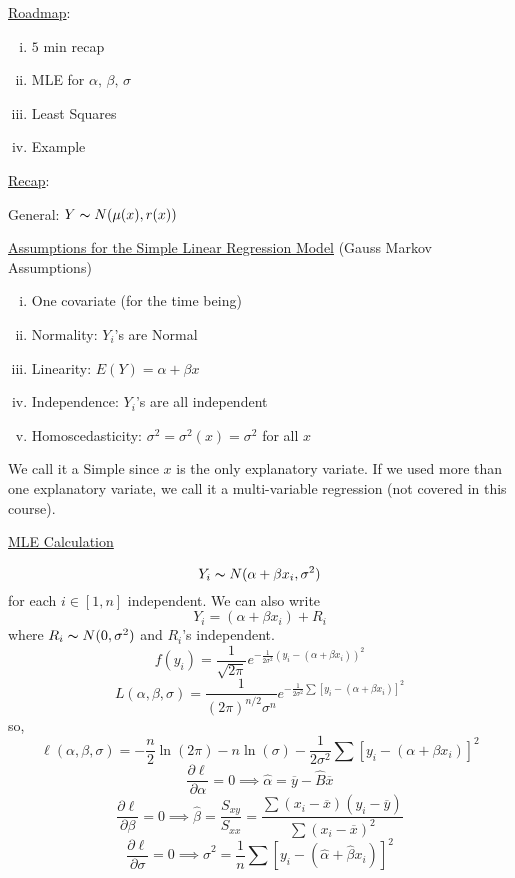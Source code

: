 \underline{Roadmap}:
\begin{enumerate}[(i)]
    \item $ 5 $ min recap
    \item MLE for $ \alpha,\,\beta,\,\sigma $
    \item Least Squares
    \item Example
\end{enumerate}

\underline{Recap}:

General: $ Y \thicksim N(\mu(x),r(x)) $

\underline{Assumptions for the Simple Linear Regression Model}
(Gauss Markov Assumptions)
\begin{enumerate}[(i)]
    \item One covariate (for the time being)
    \item Normality: $ Y_i $'s are Normal
    \item Linearity: $ E(Y)=\alpha+\beta x $
    \item Independence: $ Y_i $'s are all independent
    \item Homoscedasticity: $ \sigma^2=\sigma^2(x)=\sigma^2 $ for all $ x $
\end{enumerate}
We call it a Simple since $ x $ is the only
explanatory variate. If we used more than one explanatory variate,
we call it a multi-variable regression (not covered in this course).

\underline{MLE Calculation}

\[ Y_i \thicksim N(\alpha+\beta x_i, \sigma^2) \]
for each $ i\in[1,n] $
independent. We can also write
\[ Y_i=(\alpha+\beta x_i)+R_i \]
where $ R_i \thicksim N(0,\sigma^2) $ and $ R_i $'s independent.
\[ f(y_i)=\frac{1}{\sqrt{2 \pi}}e^{-\frac{1}{2\sigma^2}(y_i-(\alpha+\beta x_i))^2}  \]
\[
    L(\alpha, \beta, \sigma)=
    \frac{1}{(2 \pi)^{n / 2} \sigma^{n}}
    e^{-\frac{1}{2 \sigma^{2}}
            \sum\left[y_{i}-\left(\alpha+\beta x_i\right)\right]^{2}}
\]
so,
\[ \ell(\alpha,\beta,\sigma)=-\frac{n}{2} \ln(2\pi)-n\ln(\sigma)-
    \frac{1}{2\sigma^2}\sum\left[y_{i}-\left(\alpha+\beta x_i\right)\right]^{2}  \]
\[ \frac{\partial\ell}{\partial\alpha}=0\implies
    \hat{\alpha}=\overline{y}-\hat{B}\overline{x} \]
\[ \frac{\partial \ell}{\partial \beta}=0\implies
    \hat{\beta}=\frac{S_{xy}}{S_{xx}}=\frac{\sum(x_i-\overline{x})(y_i-\overline{y})}
    {\sum (x_i-\overline{x})^2}  \]
\[ \frac{\partial\ell}{\partial \sigma}=0\implies
    \hat{\sigma}^2=\frac{1}{n} \sum \left[ y_i-(\hat{\alpha}+\hat{\beta}x_i) \right]^2 \]


